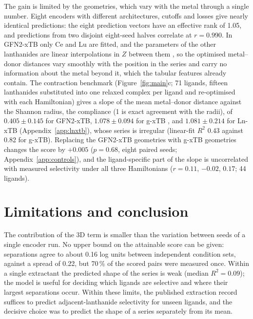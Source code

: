 The gain is limited by the geometries, which vary with the metal through a single number. Eight encoders with different architectures, cutoffs and losses give nearly identical predictions: the eight prediction vectors have an effective rank of 1.05, and predictions from two disjoint eight-seed halves correlate at $r = 0.990$. In GFN2-xTB only Ce and Lu are fitted, and the parameters of the other lanthanides are linear interpolations in $Z$ between them \citep{bannwarth2019gfn2}, so the optimised metal--donor distances vary smoothly with the position in the series and carry no information about the metal beyond it, which the tabular features already contain. The contraction benchmark (Figure~\ref{fig:main}c; 71 ligands, fifteen lanthanides substituted into one relaxed complex per ligand and re-optimised with each Hamiltonian) gives a slope of the mean metal--donor distance against the Shannon radius, the compliance \cL{} (1 is exact agreement with the radii), of $0.405 \pm 0.145$ for GFN2-xTB, $1.078 \pm 0.094$ for g-xTB \citep{gxtb}, and $1.081 \pm 0.214$ for Ln-xTB \citep{lnxtb2026} (Appendix~\ref{app:lnxtb}), whose series is irregular (linear-fit $R^2$ 0.43 against 0.82 for g-xTB). Replacing the GFN2-xTB geometries with g-xTB geometries changes the score by $+0.005$ ($p = 0.68$, eight paired seeds; Appendix~\ref{app:controls}), and the ligand-specific part of the slope is uncorrelated with measured selectivity under all three Hamiltonians ($r = 0.11$, $-0.02$, $0.17$; 44 ligands).

\section{Limitations and conclusion}
\label{sec:conclusion}
The contribution of the 3D term is smaller than the variation between seeds of a single encoder run. No upper bound on the attainable score can be given: separations agree to about 0.16 log units between independent condition sets, against a spread of 0.22, but 70\,\% of the scored pairs were measured once. Within a single extractant the predicted shape of the series is weak (median $R^2 = 0.09$); the model is useful for deciding which ligands are selective and where their largest separations occur. Within these limits, the published extraction record suffices to predict adjacent-lanthanide selectivity for unseen ligands, and the decisive choice was to predict the shape of a series separately from its mean.




